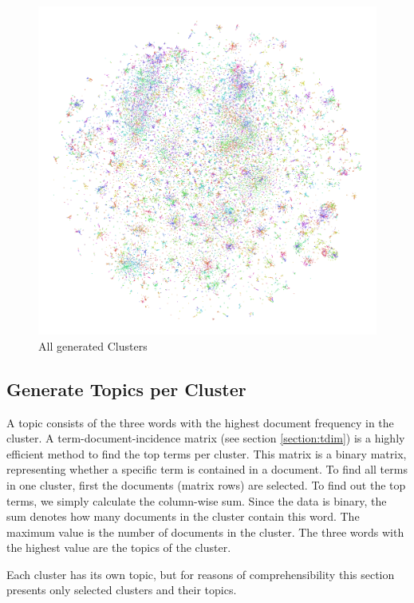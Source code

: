 \begin{figure}[!h]
	\centering
	\includegraphics[width=\linewidth]{Bilder/models/minibatchkmeans.pdf}
	\caption{All generated Clusters}
	\label{fig:kmeans}
\end{figure}


\newpage
\subsection{Generate Topics per Cluster}
\label{section:topics}
A topic consists of the three words with the highest document frequency in the cluster. A term-document-incidence matrix (see section \ref{section:tdim}) is a highly efficient method to find the top terms per cluster. This matrix is a binary matrix, representing whether a specific term is contained in a document. To find all terms in one cluster, first the documents (matrix rows) are selected. To find out the top terms, we simply calculate the column-wise sum. Since the data is binary, the sum denotes how many documents in the cluster contain this word. The maximum value is the number of documents in the cluster. The three words with the highest value are the topics of the cluster.

Each cluster has its own topic, but for reasons of comprehensibility this section presents only selected clusters and their topics.


